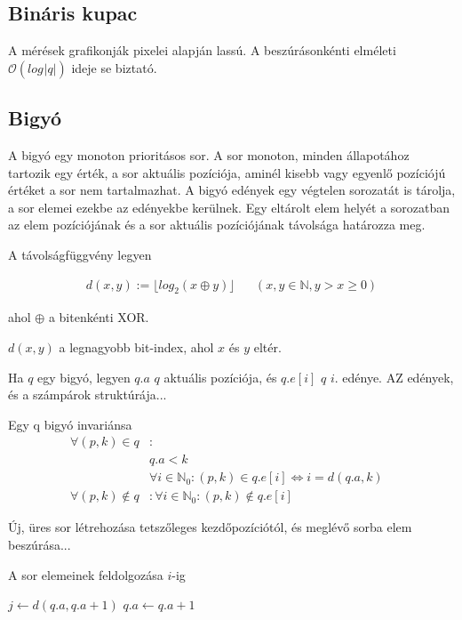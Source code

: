\subsection{Bináris kupac}

A mérések grafikonják pixelei alapján lassú. A beszúrásonkénti elméleti
$\mathcal{O}(log_{}{|q|})$ ideje se biztató.

\subsection{Bigyó} %

A bigyó egy monoton prioritásos sor.
A sor monoton, minden állapotához tartozik egy érték, a sor aktuális pozíciója,
aminél kisebb vagy egyenlő pozíciójú értéket a sor nem tartalmazhat.
A bigyó edények egy végtelen sorozatát is tárolja, a sor elemei ezekbe az edényekbe kerülnek.
Egy eltárolt elem helyét a sorozatban az elem pozíciójának
és a sor aktuális pozíciójának távolsága határozza meg.

A távolságfüggvény legyen

\begin{align*}
d(x, y) := \lfloor log_{2}{}(x \oplus y) \rfloor & & (x, y \in \mathbb{N}, y > x \ge 0)
\end{align*}

ahol $\oplus$ a bitenkénti XOR.

$d(x, y)$ a legnagyobb bit-index, ahol $x$ és $y$ eltér.

Ha $q$ egy bigyó, legyen $q.a$ $q$ aktuális pozíciója, és $q.e[i]$ $q$ $i$. edénye. AZ edények, és a számpárok struktúrája...

Egy q bigyó invariánsa
\begin{align*}
\forall (p, k) \in q &: &\\ 
	& q.a < k\\
	& \forall i \in \mathbb{N}_{0}: (p, k) \in q.e[i] \iff i=d(q.a, k) \\
\forall (p, k) \not\in q &: \forall i \in \mathbb{N}_{0}: (p, k) \not\in q.e[i]
\end{align*}

Új, üres sor létrehozása tetszőleges kezdőpozíciótól, és meglévő sorba elem beszúrása...

A sor elemeinek feldolgozása $i$-ig
\begin{algorithmic}[1]
	\State $j \gets d(q.a, q.a + 1)$
	\State $q.a \gets q.a + 1$
		\State {}
			\State {}
		\Else
			\State {}
		\EndIf
	\EndFor
\EndWhile
\end{algorithmic}

